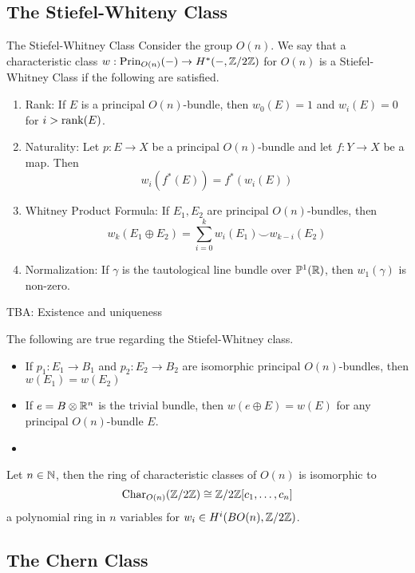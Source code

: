 \documentclass[a4paper]{article}
\begin{document}
\subsection{The Stiefel-Whiteny Class}
\begin{defn}{The Stiefel-Whitney Class}{} Consider the group $O(n)$. We say that a characteristic class $w:\text{Prin}_{O(n)}(-)\to H^\ast(-,\mathbb{Z}/2\mathbb{Z})$ for $O(n)$ is a Stiefel-Whitney Class if the following are satisfied. 
\begin{enumerate}
\item Rank: If $E$ is a principal $O(n)$-bundle, then $w_0(E)=1$ and $w_i(E)=0$ for $i>\rank(E)$. 
\item Naturality: Let $p:E\to X$ be a principal $O(n)$-bundle and let $f:Y\to X$ be a map. Then $$w_i(f^\ast(E))=f^\ast(w_i(E))$$
\item Whitney Product Formula: If $E_1,E_2$ are principal $O(n)$-bundles, then $$w_k(E_1\oplus E_2)=\sum_{i=0}^kw_i(E_1)\smile w_{k-i}(E_2)$$
\item Normalization: If $\gamma$ is the tautological line bundle over $\mathbb{P}^1(\mathbb{R})$, then $w_1(\gamma)$ is non-zero. 
\end{enumerate}
\end{defn}

TBA: Existence and uniqueness

\begin{prp}{}{} The following are true regarding the Stiefel-Whitney class. 
\begin{itemize}
\item If $p_1:E_1\to B_1$ and $p_2:E_2\to B_2$ are isomorphic principal $O(n)$-bundles, then $w(E_1)=w(E_2)$
\item If $e=B\otimes\mathbb{R}^n$ is the trivial bundle, then $w(e\oplus E)=w(E)$ for any principal $O(n)$-bundle $E$. 
\item 
\end{itemize}
\end{prp}

\begin{thm}{}{} Let $n\in\mathbb{N}$, then the ring of characteristic classes of $O(n)$ is isomorphic to $$\text{Char}_{O(n)}(\mathbb{Z}/2\mathbb{Z})\cong\mathbb{Z}/2\mathbb{Z}[c_1,\dots,c_n]$$ a polynomial ring in $n$ variables for $w_i\in H^i(BO(n),\mathbb{Z}/2\mathbb{Z})$. 
\end{thm}

\subsection{The Chern Class}
\end{document}
